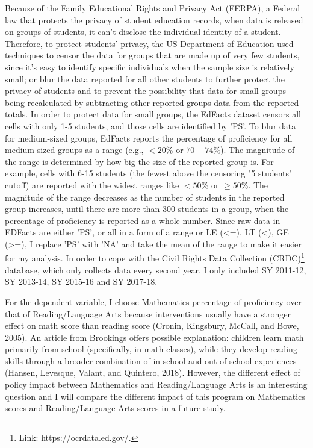Because of the Family Educational Rights and Privacy Act (FERPA), a Federal law that protects the privacy of student education records, when data is released on groups of students, it can't disclose the individual identity of a student. Therefore, to protect students’ privacy, the US Department of Education used techniques to censor the data for groups that are made up of very few students, since it's easy to identify specific individuals when the sample size is relatively small; or blur the data reported for all other students to further protect the privacy of students and to prevent the possibility that data for small groups being recalculated by subtracting other reported groups data from the reported totals. In order to protect data for small groups, the EdFacts dataset censors all cells with only 1-5 students, and those cells are identified by 'PS'. To blur data for medium-sized groups, EdFacts reports the percentage of proficiency for all medium-sized groups as a range (e.g., $<20\%$ or $70-74\%$). The magnitude of the range is determined by how big the size of the reported group is. For example, cells with 6-15 students (the fewest above the censoring "5 students" cutoff) are reported with the widest ranges like $<50\%$ or $\geq50\%$. The magnitude of the range decreases as the number of students in the reported group increases, until there are more than 300 students in a group, when the percentage of proficiency is reported as a whole number. Since raw data in EDFacts are either 'PS', or all in a form of a range or LE (<=), LT (<), GE (>=), I replace 'PS' with 'NA' and take the mean of the range to make it easier for my analysis. In order to cope with the Civil Rights Data Collection (CRDC)\footnote{Link: https://ocrdata.ed.gov/.} database, which only collects data every second year, I only included SY 2011-12, SY 2013-14, SY 2015-16 and SY 2017-18. 

For the dependent variable, I choose Mathematics percentage of proficiency over that of Reading/Language Arts because interventions usually have a stronger effect on math score than reading score (Cronin, Kingsbury, McCall, and Bowe, 2005). An article from Brookings offers possible explanation: children learn math primarily from school (specifically, in math classes), while they develop reading skills through a broader combination of in-school and out-of-school experiences (Hansen, Levesque, Valant, and Quintero, 2018). However, the different effect of policy impact between Mathematics and Reading/Language Arts is an interesting question and I will compare the different impact of this program on Mathematics scores and Reading/Language Arts scores in a future study.



